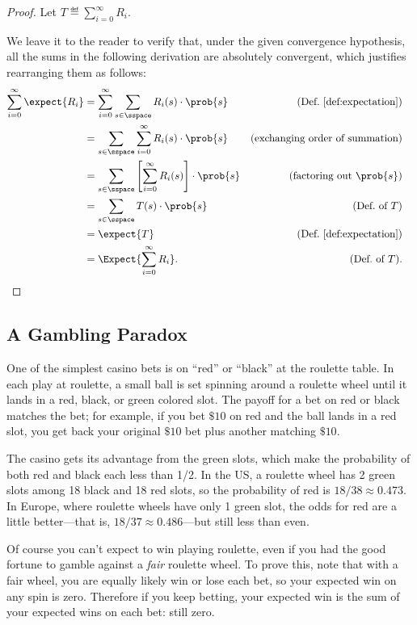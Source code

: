 \begin{proof}
Let $T \eqdef \sum_{i = 0}^\infty R_i$.

We leave it to the reader to verify that, under the given convergence
hypothesis, all the sums in the following derivation are absolutely
convergent, which justifies rearranging them as follows:
\begin{align*}
\sum_{i=0}^\infty \expect{R_i}
    &= \sum_{i=0}^\infty \sum_{s \in \sspace} R_i(s) \cdot \prob{s}
            & \text{(Def.~\ref{def:expectation})}\\
    &= \sum_{s \in \sspace} \sum_{i=0}^\infty R_i(s) \cdot \prob{s}
           & \text{(exchanging order of summation)}\\
    &= \sum_{s \in \sspace} \left[ \sum_{i=0}^\infty R_i(s) \right] \cdot \prob{s}
                & \text{(factoring out $\prob{s}$)}\\
    &= \sum_{s \in \sspace} T(s) \cdot \prob{s} & \text{(Def.\ of $T$)}\\
    &= \expect{T} & \text{(Def.~\ref{def:expectation})}\\
    &= \Expect{\sum_{i = 0}^\infty R_i}. &  \text{(Def.\ of $T$)}. &\qedhere
\end{align*}
\end{proof}

\subsection{A Gambling Paradox}

One of the simplest casino bets is on ``red'' or ``black'' at the roulette
table.  In each play at roulette, a small ball is set spinning around a
roulette wheel until it lands in a red, black, or green colored slot.
The payoff for a bet on red or black matches the bet; for example, if you bet
$\$10$ on red and the ball lands in a red slot, you get back your original
$\$10$ bet plus another matching $\$10$.

The casino gets its advantage from the green slots, which make the
probability of both red and black each less than 1/2.  In the US, a
roulette wheel has 2 green slots among 18 black and 18 red slots, so
the probability of red is $18/38 \approx 0.473$.  In Europe,
where roulette wheels have only 1 green slot, the odds for red are a
little better---that is, $18/37 \approx 0.486$---but still less
than even.

Of course you can't expect to win playing roulette, even if you had
the good fortune to gamble against a \emph{fair} roulette wheel.  To
prove this, note that with a fair wheel, you are equally likely win or
lose each bet, so your expected win on any spin is zero.  Therefore if
you keep betting, your expected win is the sum of your expected wins
on each bet: still zero.

